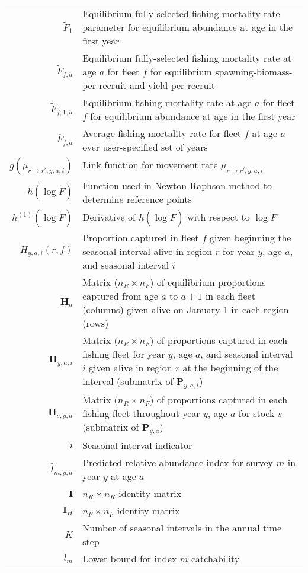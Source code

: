 \begin{longtable}[c]{r p{}}
$\widetilde{F}_1$ & Equilibrium fully-selected fishing mortality rate parameter for equilibrium abundance at age in the first year\\
$\widetilde{F}_{f,a}$ & Equilibrium fully-selected fishing mortality rate at age $a$ for fleet $f$ for equilibrium spawning-biomass-per-recruit and yield-per-recruit\\
$\widetilde{F}_{f,1,a}$ & Equilibrium fishing mortality rate at age $a$ for fleet $f$ for equilibrium abundance at age in the first year\\
$\overline{F}_{f,a}$ & Average fishing mortality rate for fleet $f$ at age $a$ over user-specified set of years\\
$g(\mu_{r\rightarrow r',y,a,i})$ & Link function for movement rate $\mu_{r\rightarrow r',y,a,i}$\\
$h(\log \widetilde{F})$ & Function used in Newton-Raphson method to determine reference points\\
$h^{(1)}(\log \widetilde{F})$ & Derivative of $h(\log \widetilde{F})$ with respect to $\log \widetilde{F}$\\
$H_{y,a,i}(r,f)$ & Proportion captured in fleet $f$ given beginning the seasonal interval alive in region $r$ for year $y$, age $a$, and seasonal interval $i$ \\
$\mathbf{H}_{a}$ & Matrix ($n_R \times n_F$) of equilibrium proportions captured from age $a$ to $a+1$ in each fleet (columns) given alive on January 1 in each region (rows)\\
$\mathbf{H}_{y,a,i}$ &  Matrix ($n_R \times n_F$) of proportions captured in each fishing fleet for year $y$, age $a$, and seasonal interval $i$ given alive in region $r$ at the beginning of the interval (submatrix of $\mathbf{P}_{y,a,i}$)\\
$\mathbf{H}_{s,y,a}$ &  Matrix ($n_R \times n_F$) of proportions captured in each fishing fleet throughout year $y$, age $a$ for stock $s$ (submatrix of $\mathbf{P}_{y,a}$)\\
$i$ & Seasonal interval indicator \\
$\widehat I_{m,y,a}$ & Predicted relative abundance index for survey $m$ in year $y$ at age $a$ \\
$\mathbf{I}$ & $n_R \times n_R$ identity matrix \\
$\mathbf{I}_{H}$ & $n_F \times n_F$ identity matrix \\
$K$ & Number of seasonal intervals in the annual time step\\
$l_{m}$ & Lower bound for index $m$ catchability\\

\end{longtable}
